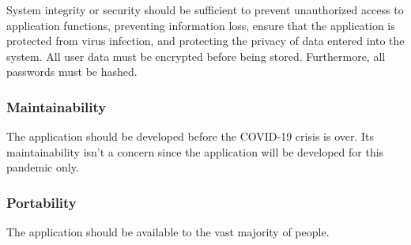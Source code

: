 
System integrity or security should be sufficient to prevent unauthorized access to application functions, preventing information loss, ensure that the application is protected from virus infection, and protecting the privacy of data entered into the system.
All user data must be encrypted before being stored.
Furthermore, all passwords must be hashed.

\subsubsection{Maintainability}


The application should be developed before the COVID-19 crisis is over.
Its maintainability isn't a concern since the application will be developed for this pandemic only.

\subsubsection{Portability}


The application should be available to the vast majority of people.
